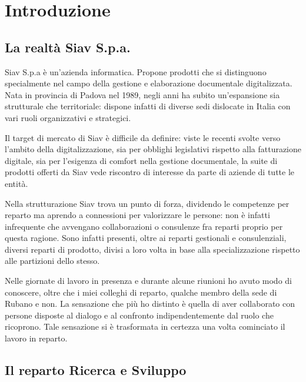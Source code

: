 
\chapter{Introduzione}
\label{cap:introduzione}
\section{La realtà Siav S.p.a.}
\label{sec:realtaSiav}
Siav S.p.a è un'azienda informatica. Propone prodotti che si distinguono specialmente nel campo della gestione e elaborazione documentale digitalizzata. Nata in provincia di Padova nel 1989, negli anni ha subito un'espansione sia strutturale che territoriale: dispone infatti di diverse sedi dislocate in Italia con vari ruoli organizzativi e strategici.

Il target di mercato di Siav è difficile da definire: viste le recenti svolte verso l'ambito della digitalizzazione, sia per obblighi legislativi rispetto alla fatturazione digitale, sia per l'esigenza di comfort nella gestione documentale, la suite di prodotti offerti da Siav vede riscontro di interesse da parte di aziende di tutte le entità.

Nella strutturazione Siav trova un punto di forza, dividendo le competenze per reparto ma aprendo a connessioni per valorizzare le persone: non è infatti infrequente che avvengano collaborazioni o consulenze fra reparti proprio per questa ragione. Sono infatti presenti, oltre ai reparti gestionali e consulenziali, diversi reparti di prodotto, divisi a loro volta in base alla specializzazione rispetto alle partizioni dello stesso.

Nelle giornate di lavoro in presenza e durante alcune riunioni ho avuto modo di conoscere, oltre che i miei colleghi di reparto, qualche membro della sede di Rubano e non. La sensazione che più ho distinto è quella di aver collaborato con persone disposte al dialogo e al confronto indipendentemente dal ruolo che ricoprono. Tale sensazione si è trasformata in certezza una volta cominciato il lavoro in reparto.


\section{Il reparto Ricerca e Sviluppo}

